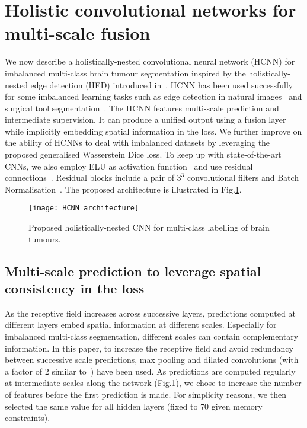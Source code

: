 \documentclass[runningheads,orivec,a4paper]{llncs}
\begin{document}
\section{Holistic convolutional networks for multi-scale fusion}
We now describe a holistically-nested convolutional neural network
(HCNN) for imbalanced multi-class brain tumour segmentation inspired by
the holistically-nested edge detection (HED) introduced
in~\cite{hed}. HCNN has been used successfully for some imbalanced
learning tasks such as edge detection in natural images~\cite{hed} and
surgical tool segmentation~\cite{toolnet}.
The HCNN features multi-scale prediction and intermediate
supervision. It can produce a unified output using a fusion layer
while implicitly embedding spatial information in the loss. 
We further improve on the ability of HCNNs to deal with imbalanced
datasets by leveraging the proposed generalised Wasserstein Dice loss. 
To keep up with state-of-the-art CNNs, we also employ ELU as
activation function~\cite{elu} and use residual
connections~\cite{resnet}. Residual blocks include a pair of $3^3$
convolutional filters and Batch Normalisation~\cite{wideresnet}. The
proposed architecture is illustrated in
Fig.\ref{fig:hcnn_architecture}. 



\begin{figure}[b!]
	\centering
	\texttt{[image: HCNN\_architecture]}
	\caption{Proposed holistically-nested CNN for multi-class labelling of brain tumours.}
	\label{fig:hcnn_architecture}
\end{figure}

\subsection{Multi-scale prediction to leverage spatial consistency in the loss}
As the receptive field 
increases across successive layers, predictions computed
at different layers embed spatial information at different scales. 
Especially for imbalanced multi-class segmentation,
different scales can contain complementary information. 
In this paper, to increase the receptive field and avoid redundancy between
successive scale predictions, max pooling and
dilated convolutions (with a factor of $2$ similar to~\cite{highresnet})
have been used. 
As predictions are computed
regularly at intermediate scales along the network (Fig.\ref{fig:hcnn_architecture}), we chose to increase the number of features before the first prediction is made. For simplicity reasons, we then selected
the same value for all hidden layers (fixed to $70$ given memory
constraints). 
\end{document}
